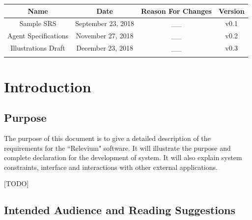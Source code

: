 \documentclass{scrreprt}
\begin{document}
\begin{center}
    \begin{tabular}{|c|c|c|c|}
        \hline
	    Name & Date & Reason For Changes & Version\\
        \hline
	   Sample SRS & September 23, 2018 & __ & v0.1\\
        \hline
        Agent Specifications & November 27, 2018 & __ & v0.2\\
        \hline
        Illustrations Draft & December 23, 2018 & __ & v0.3\\
        \hline
	   & & & \\
        \hline
    \end{tabular}
\end{center}

\chapter{Introduction}

\section{Purpose}

The purpose of this document is to give a detailed description of the requirements for the ``Relevium" software. It will illustrate the purpose and complete declaration for the development of system. It will also explain system constraints, interface and interactions with other external applications.


[TODO]

\section{Intended Audience and Reading Suggestions}
\end{document}
